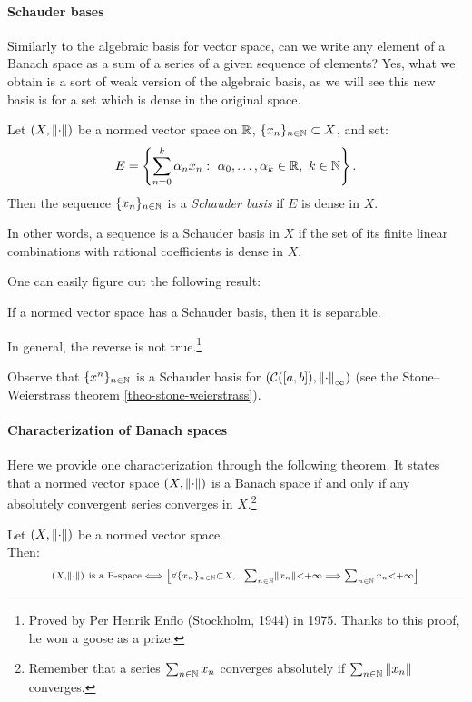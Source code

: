 \paragraph{Schauder bases} Similarly to the algebraic basis for vector space, can we write any element of a Banach space as a sum of a series of a given sequence of elements? Yes, what we obtain is a sort of weak version of the algebraic basis, as we will see this new basis is for a set which is dense in the original space.

\begin{defn}
	Let $(X,\left\lVert\cdot\right\rVert)$ be a normed vector space on $\mathbb R$, $\{x_n\}_{n \in \mathbb N}\subset X$, and set:
	$$E = \left\{\sum_{n=0}^k \alpha_n x_n : \ \alpha_0, \ldots, \alpha_k \in \RR, \  k\in \NN \right\}.$$
	Then the sequence $\{x_n\}_{n \in \mathbb N}$ is a \emph{Schauder basis} if $E$ is dense in $X$.
\end{defn}

In other words, a sequence is a Schauder basis in $X$ if the set of its finite linear combinations with rational coefficients is dense in $X$.

One can easily figure out the following result:
\begin{prop}
	If a normed vector space has a Schauder basis, then it is separable.
\end{prop}  
In general, the reverse is not true.\footnote{Proved by Per Henrik Enflo (Stockholm, 1944) in 1975. Thanks to this proof, he won a goose as a prize.}

Observe that $\{x^n\}_{n \in \mathbb N}$ is a Schauder basis for $(\mathcal C([a,b]),\left\lVert\cdot\right\rVert_\infty)$ (see the Stone--Weierstrass theorem \vref{theo-stone-weierstrass}).


\paragraph{Characterization of Banach spaces} Here we provide one characterization through the following theorem. It states that a normed vector space $(X,\left\lVert\cdot\right\rVert)$ is a Banach space if and only if any absolutely convergent series converges in $X$.\footnote{Remember that a series $\sum_{n\in\mathbb N} x_n$ converges absolutely if $\sum_{n\in\mathbb N}\left\lVert x_n\right\rVert$ converges.}

\begin{theo} \label{theo-banach-space-charact}
	Let $(X, \left\lVert\cdot\right\rVert)$ be a normed vector space. \\
	Then:
	$$
		{\scriptstyle (X,\norm{\cdot})\ \text{is a B-space} \iff \left[\forall \{x_n\}_{n\in\NN} \subset X,\ \ \sum_{n\in\NN} \norm{x_n} < +\infty \implies \sum_{n \in \NN} x_n < +\infty \right]}
	$$
\end{theo}

